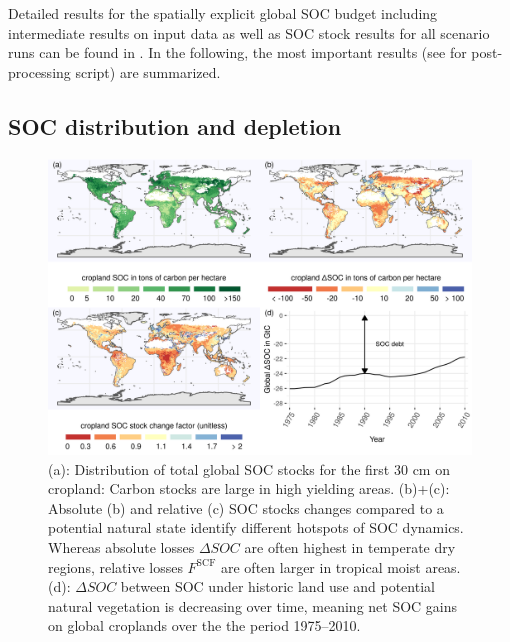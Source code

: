 \documentclass[gc, manuscript]{copernicus}
\begin{document}
Detailed results for the spatially explicit global SOC budget including intermediate results on input data as well as SOC stock results for all scenario runs can be found in \citep{karstens_model_2020}. In the following, the most important results (see \citep{karstens_result_2020} for post-processing script) are summarized.

\hypertarget{soc-distribution-and-depletion}{%
\subsection{SOC distribution and depletion}\label{soc-distribution-and-depletion}}

\begin{figure}[h]
\includegraphics[width=18cm]{../ResultNotebooks/Output/Images/4panelfigure} \caption{(a): Distribution of total global SOC stocks for the first 30 cm on cropland:  Carbon stocks are large in high yielding areas. (b)+(c): Absolute (b) and relative (c) SOC stocks changes compared to a potential natural state identify different hotspots of SOC dynamics. Whereas absolute losses $\Delta SOC$ are often highest in temperate dry regions, relative losses $F^\mathrm{SCF}$ are often larger in tropical moist areas. (d): $\Delta SOC$ between SOC under historic land use and potential natural vegetation is decreasing over time, meaning net SOC gains on global croplands over the the period 1975--2010. }\label{fig:SOCmaps}
\end{figure}
\end{document}
